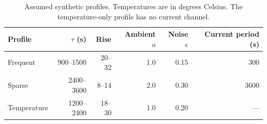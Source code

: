 \begin{table}[!htb]\centering\small
\caption{Assumed synthetic profiles. Temperatures are in degrees Celsius. The temperature-only profile has no current channel.}\label{tab:plant}
\begin{tabular}{@{}lrrrrr@{}}\toprule
Profile & $\tau$ (s) & Rise & Ambient $a$ & Noise $\epsilon$ & Current period (s)\\\midrule
Frequent & 900--1500 & 20--32 & 1.0 & 0.15 & 300\\
Sparse & 2400--3600 & 8--14 & 2.0 & 0.30 & 3600\\
Temperature & 1200--2400 & 18--30 & 1.0 & 0.20 & ---\\
\bottomrule\end{tabular}\end{table}
